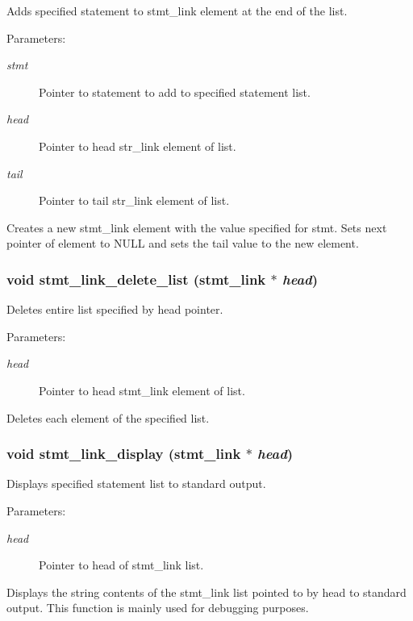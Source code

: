 Adds specified statement to stmt\_\-link element at the end of the list. 

\begin{Desc}
\item[Parameters:]
\begin{description}
\item[{\em stmt}]Pointer to statement to add to specified statement list. \item[{\em head}]Pointer to head str\_\-link element of list. \item[{\em tail}]Pointer to tail str\_\-link element of list.\end{description}
\end{Desc}
Creates a new stmt\_\-link element with the value specified for stmt. Sets next pointer of element to NULL and sets the tail value to the new element. 
\subsubsection{\setlength{\rightskip}{0pt plus 5cm}void stmt\_\-link\_\-delete\_\-list ({\bf stmt\_\-link} $\ast$ {\em head})}\label{link_8c_a19}


Deletes entire list specified by head pointer. 

\begin{Desc}
\item[Parameters:]
\begin{description}
\item[{\em head}]Pointer to head stmt\_\-link element of list.\end{description}
\end{Desc}
Deletes each element of the specified list. 
\subsubsection{\setlength{\rightskip}{0pt plus 5cm}void stmt\_\-link\_\-display ({\bf stmt\_\-link} $\ast$ {\em head})}\label{link_8c_a7}


Displays specified statement list to standard output. 

\begin{Desc}
\item[Parameters:]
\begin{description}
\item[{\em head}]Pointer to head of stmt\_\-link list.\end{description}
\end{Desc}
Displays the string contents of the stmt\_\-link list pointed to by head to standard output. This function is mainly used for debugging purposes. 
